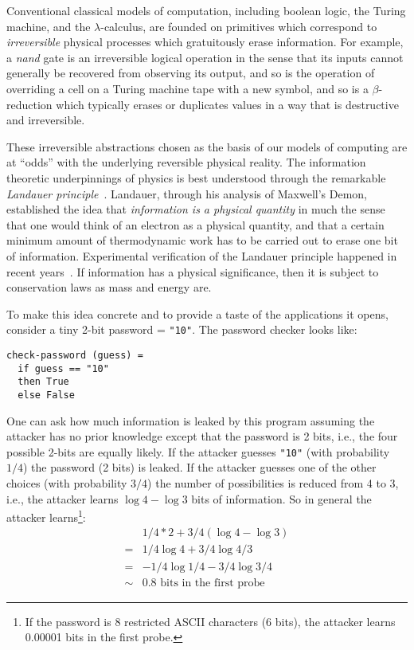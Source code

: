 \documentclass{article}
\begin{document}
Conventional classical models of computation, including boolean
logic, the Turing machine, and the $\lambda$-calculus, are founded on
primitives which correspond to \emph{irreversible} physical processes which
gratuitously erase information.  For example, a \emph{nand} gate is an
irreversible logical operation in the sense that its inputs cannot generally
be recovered from observing its output, and so is the operation of overriding
a cell on a Turing machine tape with a new symbol, and so is a
$\beta$-reduction which typically erases or duplicates values in a way that
is destructive and irreversible.

These irreversible abstractions chosen as the basis of our
models of computing are at ``odds'' with the underlying
reversible physical reality. The information theoretic underpinnings
of physics is best understood through the remarkable \emph{Landauer
  principle}~\cite{Landauer:1961}. Landauer, through his analysis of
Maxwell's Demon, established the idea that \emph{information is a
physical quantity} in much the sense that one would think of an
electron as a physical quantity, and that a certain minimum amount of
thermodynamic work has to be carried out to erase one bit of
information. Experimental verification of the Landauer principle
happened in recent years~\cite{berut2012experimental}. If information
has a physical significance, then it is subject to conservation laws
as mass and energy are. 

To make this idea concrete and to provide a taste of the applications
it opens, consider a tiny 2-bit password = \verb|"10"|. The password
checker looks like:

\begin{verbatim}
check-password (guess) = 
  if guess == "10"
  then True
  else False
\end{verbatim}

One can ask how much information is leaked by this program assuming
the attacker has no prior knowledge except that the password is 2
bits, i.e., the four possible 2-bits are equally likely. If the
attacker guesses \verb|"10"| (with probability $1/4$) the password (2
bits) is leaked. If the attacker guesses one of the other choices
(with probability $3/4$) the number of possibilities is reduced from 4
to 3, i.e., the attacker learns $\log{4} - \log{3}$ bits of
information. So in general the attacker learns\footnote{If the
  password is 8 restricted ASCII characters (6 bits), the attacker
  learns 0.00001 bits in the first probe.}:
\[\begin{array}{ll}
   &  1/4 * 2 + 3/4 (\log{4} - \log{3}) \\
  =&  1/4 \log{4} + 3/4 \log{4/3} \\
  =&  - 1/4 \log{1/4} - 3/4 \log{3/4} \\
  \sim& 0.8 \mbox{~bits~in~the~first~probe}
\end{array}\]
\end{document}
